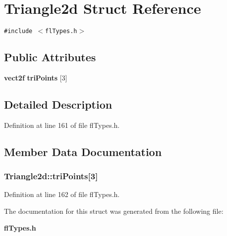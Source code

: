 \section{Triangle2d Struct Reference}
\label{structTriangle2d}
{\tt \#include $<$fl\-Types.h$>$}

\subsection*{Public Attributes}
\begin{CompactItemize}
\item 
{\bf vect2f} {\bf tri\-Points} [3]
\end{CompactItemize}


\subsection{Detailed Description}




Definition at line 161 of file fl\-Types.h.

\subsection{Member Data Documentation}
\subsubsection{ {\bf Triangle2d::tri\-Points}[3]}\label{structTriangle2d_1ec5f293225d3da5d6802c2f82b85fcf}




Definition at line 162 of file fl\-Types.h.

The documentation for this struct was generated from the following file:\begin{CompactItemize}
\item 
{\bf fl\-Types.h}\end{CompactItemize}
